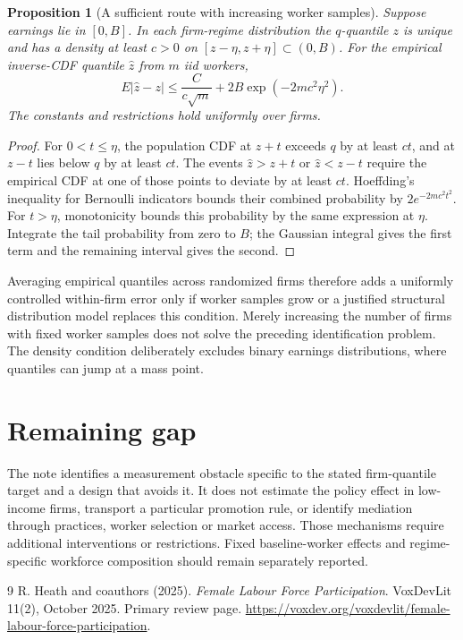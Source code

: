 \documentclass[11pt]{article}
\newtheorem{proposition}[theorem]{Proposition}
\theoremstyle{remark}
\begin{document}
\begin{proposition}[A sufficient route with increasing worker samples]
Suppose earnings lie in $[0,B]$. In each firm-regime distribution the $q$-quantile $z$ is unique and has a density at least $c>0$ on $[z-\eta,z+\eta]\subset(0,B)$. For the empirical inverse-CDF quantile $\widehat z$ from $m$ iid workers,
\[
 E|\widehat z-z|\le \frac{C}{c\sqrt m}
             +2B\exp(-2mc^2\eta^2).
\]
The constants and restrictions hold uniformly over firms.
\end{proposition}
\begin{proof}
For $0<t\le\eta$, the population CDF at $z+t$ exceeds $q$ by at least $ct$, and at $z-t$ lies below $q$ by at least $ct$. The events $\widehat z>z+t$ or $\widehat z<z-t$ require the empirical CDF at one of those points to deviate by at least $ct$. Hoeffding's inequality for Bernoulli indicators bounds their combined probability by $2e^{-2mc^2t^2}$. For $t>\eta$, monotonicity bounds this probability by the same expression at $\eta$. Integrate the tail probability from zero to $B$; the Gaussian integral gives the first term and the remaining interval gives the second.
\end{proof}
Averaging empirical quantiles across randomized firms therefore adds a uniformly controlled within-firm error only if worker samples grow or a justified structural distribution model replaces this condition. Merely increasing the number of firms with fixed worker samples does not solve the preceding identification problem. The density condition deliberately excludes binary earnings distributions, where quantiles can jump at a mass point.

\section*{Remaining gap}
The note identifies a measurement obstacle specific to the stated firm-quantile target and a design that avoids it. It does not estimate the policy effect in low-income firms, transport a particular promotion rule, or identify mediation through practices, worker selection or market access. Those mechanisms require additional interventions or restrictions. Fixed baseline-worker effects and regime-specific workforce composition should remain separately reported.

\begin{thebibliography}{9}
 R. Heath and coauthors (2025). \emph{Female Labour Force Participation}. VoxDevLit 11(2), October 2025. Primary review page. \url{https://voxdev.org/voxdevlit/female-labour-force-participation}.
\end{thebibliography}
\end{document}
